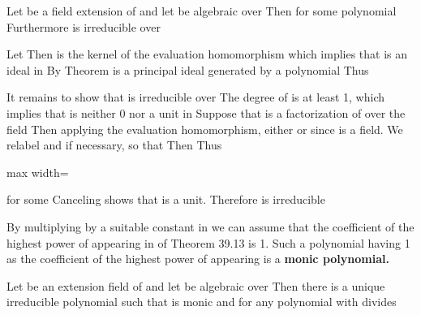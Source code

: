 \documentclass[11pt,oneside]{article}
\begin{document}
\begin{BookBody}
 Let  be a field extension of  and let  be algebraic over  Then   for some polynomial  Furthermore is irreducible over 

 Let  Then  is the kernel of the evaluation homomorphism  which implies that  is an ideal in  By Theorem  is a principal ideal generated by a polynomial  Thus 

It remains to show that  is irreducible over  The degree of  is at least 1, which implies that  is neither 0 nor a unit in  Suppose that  is a factorization of  over the field  Then applying the evaluation homomorphism, either  or  since  is a field. We relabel  and  if necessary, so that  Then  Thus

\begin{center}\begin{adjustbox}{max width=\linewidth}\end{adjustbox}\end{center}

\noindent for some  Canceling  shows that  is a unit. Therefore is irreducible\BookEnd{\blacklozenge}

By multiplying by a suitable constant in  we can assume that the coefficient of the highest power of  appearing in  of Theorem 39.13 is 1. Such a polynomial having 1 as the coefficient of the highest power of  appearing is a\textbf{ monic polynomial.}

 Let  be an extension field of  and let  be algebraic over  Then there is a unique irreducible polynomial  such that  is monic and for any polynomial  with  divides 


\end{BookBody}
\end{document}
